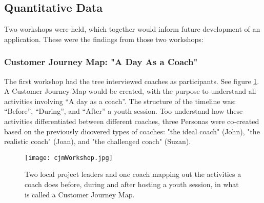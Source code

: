 \subsection{Quantitative Data}


    Two workshops were held, which together would inform future development of an application. These were the findings from those two workshops:

    \subsubsection{Customer Journey Map: "A Day As a Coach"}

    The first workshop had the tree interviewed coaches as participants. See figure \ref{fig:cjm}. A Customer Journey Map would be created, with the purpose to understand all activities involving “A day as a coach”. The structure of the timeline was: “Before”, “During”, and “After” a youth session. Too understand how these activities differentiated between different coaches, three Personas were co-created based on the previously dicovered types of coaches: "the ideal coach" (John), "the realistic coach" (Joan), and "the challenged coach" (Suzan).

    \begin{figure}[h]
        \centering
        \texttt{[image: cjmWorkshop.jpg]}
        \caption{Two local project leaders and one coach mapping out the activities a coach does before, during and after hosting a youth session, in what is called a Customer Journey Map.}
        \label{fig:cjm}
    \end{figure}





